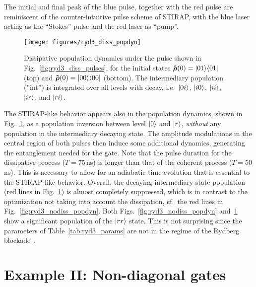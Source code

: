 The initial and final peak of the blue pulse, together with the red pulse are
reminiscent of the counter-intuitive pulse scheme of STIRAP, with the blue laser
acting as the ``Stokes'' pulse and the red laser as ``pump''.
\begin{figure}[tbp] %
  \centering
  \texttt{[image: figures/ryd3\_diss\_popdyn]}
  \caption{Dissipative population dynamics under the pulse shown in
           Fig.~\ref{fig:ryd3_diss_pulses}, for the initial states
           $\Op\rho(0) = \Ket{01}\!\Bra{01}$ (top) and
           $\Op\rho(0) = \Ket{00}\!\Bra{00}$ (bottom).
           The intermediary population
           (''int'') is integrated over all levels with  decay, i.e.\
           $\Ket{0i}$, $\Ket{i0}$, $\Ket{ii}$, $\Ket{ir}$, and $\Ket{ri}$.
  }
  \label{fig:ryd3_diss_popdyn}
\end{figure}
The STIRAP-like behavior appears also in the population dynamics, shown
in Fig.~\ref{fig:ryd3_diss_popdyn}, as a population inversion between level
$\Ket{0}$ and $\Ket{r}$, \emph{without} any population in the intermediary
decaying state. The amplitude modulations in the central region of both pulses
then induce some additional dynamics, generating the entanglement needed for the
gate.
Note that the pulse duration for the dissipative process ($T = 75\,$ns) is longer
than that of the coherent process ($T = 50\,$ns). This is necessary to allow for
an adiabatic time evolution that is essential to the STIRAP-like behavior.
Overall, the decaying intermediary state population (red lines in
Fig.~\ref{fig:ryd3_diss_popdyn}) is almost completely suppressed,
which is in contrast to the optimization not taking into account
the dissipation, cf.\ the red lines in Fig.~\ref{fig:ryd3_nodiss_popdyn}.
Both Figs.~\ref{fig:ryd3_nodiss_popdyn} and~\ref{fig:ryd3_diss_popdyn}
show a significant population of the  $\Ket{rr}$ state. This is not
surprising since the parameters of Table~\ref{tab:ryd3_params} are
not in the regime of the Rydberg blockade~\cite{JakschPRL00,SaffmanRMP10}.

\section{Example II: Non-diagonal gates}
\label{sec:3st_nondiag_gate}

